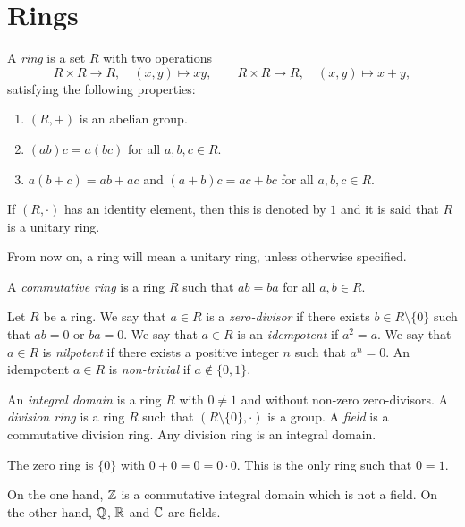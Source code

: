 \section{Rings}

A {\em ring} is a set $R$ with two operations
\[
R\times R\rightarrow R,
\quad
(x,y)\mapsto xy,
\qquad
R\times R\rightarrow R,
\quad
(x,y)\mapsto x+y,
\]
satisfying the following properties:
\begin{enumerate}
	\item $(R,+)$ is an abelian group.
	\item $(ab)c=a(bc)$ for all $a,b,c\in R$.
    \item $a(b+c)=ab+ac$ and $(a+b)c=ac+bc$ for all $a,b,c\in R$.
\end{enumerate}
If $(R,\cdot)$ has an identity element, then this is denoted by $1$ 
and it is said that $R$ is a unitary ring. 

\begin{convention}
    From now on, a ring will mean a unitary ring, unless otherwise specified. 
\end{convention}

A {\em commutative ring} is a ring $R$ such that
$ab=ba$ for all $a,b\in R$.

Let $R$ be a ring. We say that $a\in R$ is a {\em zero-divisor} if there exists $b\in R\setminus\{0\}$ 
such that $ab=0$ or $ba=0$. We say that $a\in R$ is an {\em idempotent} if $a^2=a$. 
We say that $a\in R$ is {\em nilpotent} if there exists a positive integer $n$ such that $a^n=0$.  
An idempotent $a\in R$ is {\em non-trivial} if $a\not\in\{0,1\}$.

An {\em integral domain} is a ring $R$ with $0\neq 1$ and without non-zero zero-divisors.
A {\em division ring} is a ring $R$ such that $(R\setminus \{0\},\cdot)$ is a group. 
A {\em field} is a commutative division ring. Any division ring is an integral domain.

\begin{example} 
    The zero ring is $\{0\}$ with $0+0=0=0\cdot 0$. This is the only ring such that $0=1$.
\end{example}

\begin{example}
    On the one hand, $\mathbb{Z}$ is a commutative integral domain which is not a field. On the other hand, 
    $\mathbb{Q}$, $\mathbb{R}$ and $\mathbb{C}$ are fields.
\end{example}


